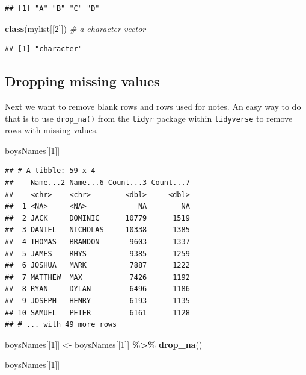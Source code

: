 \documentclass[
]{book}
\newenvironment{Shaded}{\begin{snugshade}}{\end{snugshade}}
\newcommand{\CommentTok}[1]{\textcolor[rgb]{0.56,0.35,0.01}{\textit{#1}}}
\newcommand{\DecValTok}[1]{\textcolor[rgb]{0.00,0.00,0.81}{#1}}
\newcommand{\KeywordTok}[1]{\textcolor[rgb]{0.13,0.29,0.53}{\textbf{#1}}}
\newcommand{\NormalTok}[1]{#1}
\newcommand{\OperatorTok}[1]{\textcolor[rgb]{0.81,0.36,0.00}{\textbf{#1}}}
\newcommand{\StringTok}[1]{\textcolor[rgb]{0.31,0.60,0.02}{#1}}
\begin{document}
\begin{verbatim}
## [1] "A" "B" "C" "D"
\end{verbatim}

\begin{Shaded}
\begin{Highlighting}[]
\KeywordTok{class}\NormalTok{(mylist[[}\DecValTok{2}\NormalTok{]]) }\CommentTok{\# a character vector}
\end{Highlighting}
\end{Shaded}

\begin{verbatim}
## [1] "character"
\end{verbatim}

\hypertarget{dropping-missing-values}{%
\subsection{Dropping missing values}\label{dropping-missing-values}}

Next we want to remove blank rows and rows used for notes. An easy way
to do that is to use \texttt{drop\_na()} from the \texttt{tidyr} package within \texttt{tidyverse}
to remove rows with missing values.

\begin{Shaded}
\begin{Highlighting}[]
\NormalTok{boysNames[[}\DecValTok{1}\NormalTok{]]}
\end{Highlighting}
\end{Shaded}

\begin{verbatim}
## # A tibble: 59 x 4
##    Name...2 Name...6 Count...3 Count...7
##    <chr>    <chr>        <dbl>     <dbl>
##  1 <NA>     <NA>            NA        NA
##  2 JACK     DOMINIC      10779      1519
##  3 DANIEL   NICHOLAS     10338      1385
##  4 THOMAS   BRANDON       9603      1337
##  5 JAMES    RHYS          9385      1259
##  6 JOSHUA   MARK          7887      1222
##  7 MATTHEW  MAX           7426      1192
##  8 RYAN     DYLAN         6496      1186
##  9 JOSEPH   HENRY         6193      1135
## 10 SAMUEL   PETER         6161      1128
## # ... with 49 more rows
\end{verbatim}

\begin{Shaded}
\begin{Highlighting}[]
\NormalTok{boysNames[[}\DecValTok{1}\NormalTok{]] \textless{}{-}}\StringTok{ }\NormalTok{boysNames[[}\DecValTok{1}\NormalTok{]] }\OperatorTok{\%\textgreater{}\%}\StringTok{ }\KeywordTok{drop\_na}\NormalTok{()}

\NormalTok{boysNames[[}\DecValTok{1}\NormalTok{]]}
\end{Highlighting}
\end{Shaded}
\end{document}
